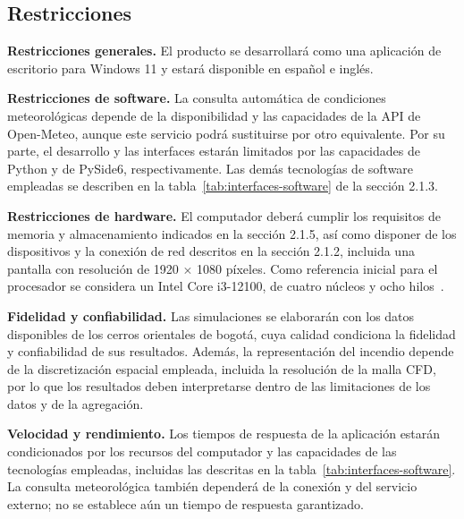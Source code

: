 \subsection{Restricciones}{\color{black}
\textbf{Restricciones generales.} El producto se desarrollará como una aplicación de escritorio para Windows 11 y estará disponible en español e inglés.

\textbf{Restricciones de software.} La consulta automática de condiciones meteorológicas depende de la disponibilidad y las capacidades de la API de Open-Meteo, aunque este servicio podrá sustituirse por otro equivalente. Por su parte, el desarrollo y las interfaces estarán limitados por las capacidades de Python y de PySide6, respectivamente. Las demás tecnologías de software empleadas se describen en la tabla~\ref{tab:interfaces-software} de la sección 2.1.3.

\textbf{Restricciones de hardware.} El computador deberá cumplir los requisitos de memoria y almacenamiento indicados en la sección 2.1.5, así como disponer de los dispositivos y la conexión de red descritos en la sección 2.1.2, incluida una pantalla con resolución de 1920 $\times$ 1080 píxeles. Como referencia inicial para el procesador se considera un Intel Core i3-12100, de cuatro núcleos y ocho hilos~\cite{intel_i3_12100}.

\textbf{Fidelidad y confiabilidad.} Las simulaciones se elaborarán con los datos disponibles de los cerros orientales de bogotá, cuya calidad condiciona la fidelidad y confiabilidad de sus resultados. Además, la representación del incendio depende de la discretización espacial empleada, incluida la resolución de la malla CFD, por lo que los resultados deben interpretarse dentro de las limitaciones de los datos y de la agregación.

\textbf{Velocidad y rendimiento.} Los tiempos de respuesta de la aplicación estarán condicionados por los recursos del computador y las capacidades de las tecnologías empleadas, incluidas las descritas en la tabla~\ref{tab:interfaces-software}. La consulta meteorológica también dependerá de la conexión y del servicio externo; no se establece aún un tiempo de respuesta garantizado.
}